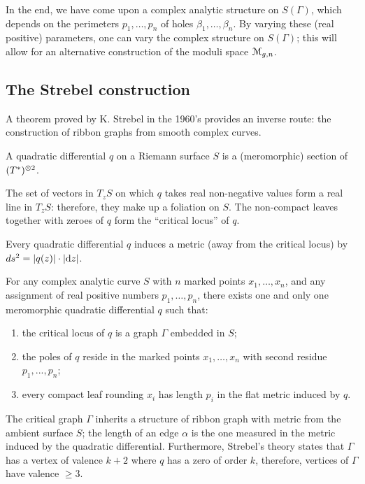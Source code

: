 In the end, we have come upon a complex analytic structure on
$S(\Gamma)$, which depends on the perimeters $p_1, \ldots, p_n$ of holes $\beta_1,
\ldots, \beta_n$. By varying these (real positive) parameters, one can vary
the complex structure on $S(\Gamma)$; this will allow for an alternative
construction of the moduli space $\mathcal{M}_{g,n}$.


\subsection{The Strebel construction}
\label{sec:strebel}
A theorem proved by K. Strebel in the 1960's provides an inverse
route: the construction of ribbon graphs from smooth complex curves.

\begin{definition}
  A quadratic differential $q$ on a Riemann surface $S$ is a
  (meromorphic) section of $(T^*)\sp{\otimes 2}$.
\end{definition}
The set of vectors in $T_zS$ on which $q$ takes real non-negative
values form a real line in $T_zS$: therefore, they make up a foliation
on $S$. The non-compact leaves together with zeroes of $q$ form the
``critical locus'' of $q$.

Every quadratic differential $q$ induces a metric (away from the
critical locus) by $ds^2 = \lvert q(z)\rvert \cdot \lvert\mathrm{d} z\rvert$.

\begin{theorem} For any complex
  analytic curve $S$ with $n$ marked points $x_1, \ldots, x_n$, and any
  assignment of real positive numbers $p_1, \ldots, p_n$, there exists one
  and only one meromorphic quadratic differential $q$ such that:
  \begin{enumerate}
  \item the critical locus of $q$ is a graph $\Gamma$ embedded in $S$;
  \item the poles of $q$ reside in the marked points $x_1, \ldots, x_n$
    with second residue $p_1, ..., p_n$;
  \item every compact leaf rounding $x_i$ has length $p_i$ in the flat
    metric induced by $q$.
  \end{enumerate}
\end{theorem}
The critical graph $\Gamma$ inherits a structure of ribbon graph with
metric from the ambient surface $S$; the length of an edge $\alpha$ is the
one measured in the metric induced by the quadratic
differential. Furthermore, Strebel's theory states that $\Gamma$ has a
vertex of valence $k+2$ where $q$ has a zero of order $k$, therefore,
vertices of $\Gamma$ have valence $\geq3$.

